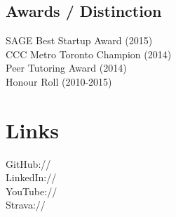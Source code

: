 \documentclass[]{deedy-resume-openfont}
\begin{document}
\begin{minipage}[t]{0.33\textwidth}
\subsection{Awards / Distinction}
\textbullet{} SAGE Best Startup Award (2015) \\
\textbullet{} CCC Metro Toronto Champion (2014) \\
\textbullet{} Peer Tutoring Award (2014)\\
\textbullet{} Honour Roll (2010-2015) \\

\vspace{1mm}


\section{Links} 
GitHub:// \href{https://github.com/MathBunny}{} \\
LinkedIn://  \href{https://www.linkedin.com/in/horatiulazu}{} \\
YouTube://  \href{https://www.youtube.com/user/SoftwareEngenius}{} \\
Strava://  \href{https://www.strava.com/athletes/6214103}{} \\
\sectionsep

%
%

\end{minipage} 
\hfill
\end{document}
